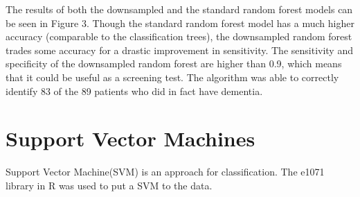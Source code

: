 \documentclass[a4paper,man,natbib,11pt]{article}
\begin{document}
The results of both the downsampled and the standard random forest models can be seen in Figure 3. Though the standard random forest model has a much higher accuracy (comparable to the classification trees), the downsampled random forest trades some accuracy for a drastic improvement in sensitivity. The sensitivity and specificity of the downsampled random forest are higher than 0.9, which means that it could be useful as a screening test. The algorithm was able to correctly identify 83 of the 89 patients who did in fact have dementia.

\section{Support Vector Machines}

Support Vector Machine(SVM) is an approach for classification. The e1071 library in R was used to put a SVM to the data. 
\end{document}
